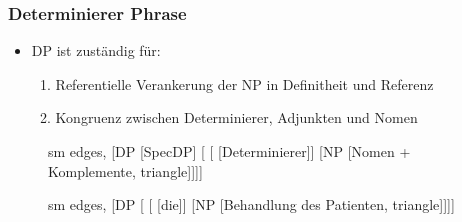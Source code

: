 \begin{frame}
\frametitle{Determinierer Phrase}

	\begin{itemize}
		\item DP ist zuständig für:
		\begin{enumerate}
			\item Referentielle Verankerung der NP in Definitheit und Referenz
			\item Kongruenz zwischen Determinierer, Adjunkten und Nomen
		\end{enumerate}				
	\end{itemize}


\begin{figure}[b]
  	\begin{minipage}[b]{0.45\textwidth}
	\centering
	\footnotesize{
		\begin{forest}
		sm edges,
		[DP [SpecDP]
			[ 	[ [Determinierer]]
						[NP [Nomen + Komplemente, triangle]]]]
		\end{forest}
		}
  	\end{minipage}  
 	\pause            
	\begin{minipage}[b]{0.45\textwidth}
	\centering
	\footnotesize{
		\begin{forest}
		sm edges,
		[DP [ 	[ [die]]
						[NP [Behandlung des Patienten, triangle]]]]
		\end{forest}
		}
  	\end{minipage}  
\end{figure}

\end{frame}


